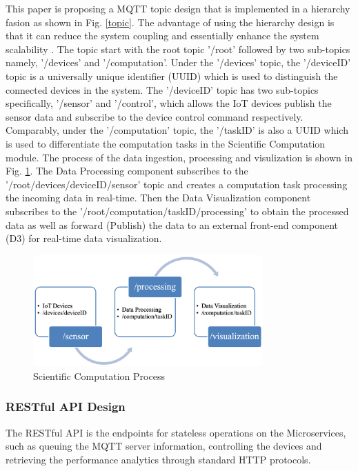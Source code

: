 \documentclass[conference]{IEEEtran}
\begin{document}
This paper is proposing a MQTT topic design that is implemented in a hierarchy fasion as shown in Fig. \ref{topic}. The advantage of using the hierarchy design is that it can reduce the system coupling and essentially enhance the system scalability \cite{b15}. The topic start with the root topic '/root' followed by two sub-topics namely, '/devices' and '/computation'. Under the '/devices' topic, the '/deviceID' topic is a universally unique identifier (UUID) which is used to distinguish the connected devices in the system. The '/deviceID' topic has two sub-topics specifically, '/sensor' and '/control', which allows the IoT devices publish the sensor data and subscribe to the device control command respectively. Comparably, under the '/computation' topic, the '/taskID' is also a UUID which is used to differentiate the computation tasks in the Scientific Computation module. The process of the data ingestion, processing and visulization is shown in Fig. \ref{process}. The Data Processing component subscribes to the '/root/devices/deviceID/sensor' topic and creates a computation task processing the incoming data in real-time. Then the Data Visualization component subscribes to the '/root/computation/taskID/processing' to obtain the processed data as well as forward (Publish) the data to an external front-end component (D3) for real-time data visualization.

\begin{figure}[htbp]
\centering
\includegraphics[width=250pt]{process.png}
\caption{Scientific Computation Process}
\label{process}
\end{figure}

\subsubsection{RESTful API Design}

The RESTful API is the endpoints for stateless operations on the Microservices, such as queuing the MQTT server information, controlling the devices and retrieving the performance analytics through standard HTTP protocols.
\end{document}
